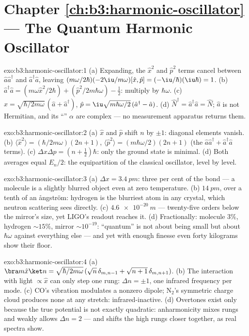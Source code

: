 \section*{Chapter \ref{ch:b3:harmonic-oscillator} --- The Quantum Harmonic Oscillator}

\begin{solution}{exo:b3:harmonic-oscillator:1}
(a) Expanding, the $\hat x^2$ and $\hat p^2$ terms cancel between
$\hat a\hat a^\dagger$ and $\hat a^\dagger\hat a$, leaving
$(m\omega/2\hbar)(-2\iu/m\omega)[\hat x, \hat p] =
(-\iu/\hbar)(\iu\hbar) = 1$. (b) $\hat a^\dagger\hat a = (m\omega\hat x^2/2\hbar) +
(\hat p^2/2m\hbar\omega) - \tfrac12$: multiply by $\hbar\omega$. (c)
$\hat x = \sqrt{\hbar/2m\omega}\,(\hat a + \hat a^\dagger)$, $\hat p
= \iu\sqrt{m\hbar\omega/2}\,(\hat a^\dagger - \hat a)$. (d) $\hat
N^\dagger = \hat a^\dagger\hat a = \hat N$; $\hat a$ is not
Hermitian, and its ``'' $\alpha$ are complex --- no
measurement apparatus returns them.
\end{solution}

\begin{solution}{exo:b3:harmonic-oscillator:2}
(a) $\hat x$ and $\hat p$ shift $n$ by $\pm1$: diagonal elements
vanish. (b) $\langle\hat x^2\rangle = (\hbar/2m\omega)(2n + 1)$,
$\langle\hat p^2\rangle = (m\hbar\omega/2)(2n + 1)$ (the $\hat
a\hat a^\dagger + \hat a^\dagger\hat a$ terms). (c) $\Delta x\Delta p
= (n + \tfrac12)\hbar$: only the ground state is minimal. (d) Both
averages equal $E_n/2$: the equipartition of the classical
oscillator, level by level.
\end{solution}

\begin{solution}{exo:b3:harmonic-oscillator:3}
(a) $\Delta x = \qty{3.4}{pm}$: three per cent of the bond --- a
molecule is a slightly blurred object even at zero temperature. (b)
$\qty{14}{pm}$, over a tenth of an ångström: hydrogen is the
blurriest atom in any crystal, which neutron scattering sees
directly. (c) $\qty{4.6e-20}{m}$ --- twenty-five orders below the
mirror's size, yet LIGO's readout reaches it. (d) Fractionally:
molecule $3\%$, hydrogen $\sim15\%$, mirror $\sim10^{-19}$:
``quantum'' is not about being small but about $\hbar\omega$
against everything else --- and yet with enough finesse even forty
kilograms show their floor.
\end{solution}

\begin{solution}{exo:b3:harmonic-oscillator:4}
(a) $\bra m\hat x\ket n = \sqrt{\hbar/2m\omega}\,(\sqrt n\,
\delta_{m,n-1} + \sqrt{n + 1}\,\delta_{m,n+1})$. (b) The interaction
with light $\propto\hat x$ can only step one rung: $\Delta n =
\pm1$, one infrared frequency per mode. (c) CO's vibration modulates
a nonzero dipole; N$_2$'s symmetric charge cloud produces none at
any stretch: infrared-inactive. (d) Overtones exist only because the
true potential is not exactly quadratic: anharmonicity mixes rungs
and weakly allows $\Delta n = 2$ --- and shifts the high rungs
closer together, as real spectra show.
\end{solution}

